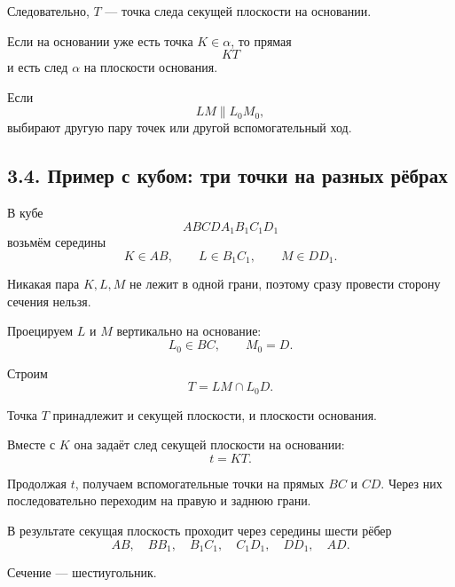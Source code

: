 \documentclass[a4paper,12pt]{article}
\begin{document}
Следовательно,
$T$ --- точка следа секущей плоскости
на основании.

Если на основании уже есть точка
$K\in\alpha$,
то прямая
\[
KT
\]
и есть след $\alpha$
на плоскости основания.

Если
\[
LM\parallel L_0M_0,
\]
выбирают другую пару точек
или другой вспомогательный ход.

\subsection*{3.4. Пример с кубом: три точки на разных рёбрах}

В кубе
\[
ABCDA_1B_1C_1D_1
\]
возьмём середины
\[
K\in AB,
\qquad
L\in B_1C_1,
\qquad
M\in DD_1.
\]

Никакая пара $K,L,M$
не лежит в одной грани,
поэтому сразу провести сторону сечения нельзя.

Проецируем $L$ и $M$
вертикально на основание:
\[
L_0\in BC,
\qquad
M_0=D.
\]

Строим
\[
T=LM\cap L_0D.
\]

Точка $T$ принадлежит
и секущей плоскости,
и плоскости основания.

Вместе с $K$
она задаёт след секущей плоскости на основании:
\[
t=KT.
\]

Продолжая $t$,
получаем вспомогательные точки
на прямых $BC$ и $CD$.
Через них последовательно переходим
на правую и заднюю грани.

В результате секущая плоскость
проходит через середины шести рёбер
\[
AB,\quad
BB_1,\quad
B_1C_1,\quad
C_1D_1,\quad
DD_1,\quad
AD.
\]

Сечение --- шестиугольник.
\end{document}
